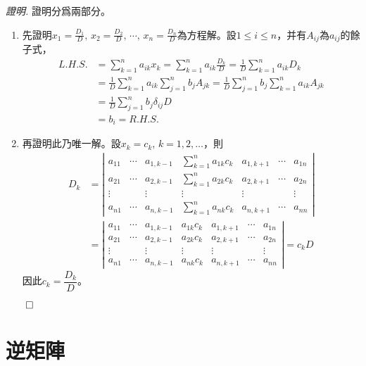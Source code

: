 \documentclass[12pt]{article}
\renewenvironment*{proof}{\textit{證明.}}{\hfill$\qed$}
\begin{document}
    \begin{proof}
        證明分爲兩部分。\begin{enumerate}
            \item 先證明$x_1=\frac{D_1}{D},\, x_2=\frac{D_2}{D},\, \cdots,\, x_n=\frac{D_n}{D}$為方程解。設$1\leq i\leq n$，并有$A_{ij}$為$a_{ij}$的餘子式，\begin{align*}
                L.H.S.&=\sum_{k=1}^{n}a_{ik}x_k=\sum_{k=1}^{n}a_{ik}\frac{D_k}{D}=\frac{1}{D}\sum_{k=1}^{n}a_{ik}D_k\\
                &=\frac{1}{D}\sum_{k=1}^{n}a_{ik}\sum_{j=1}^{n}b_jA_{jk}=\frac{1}{D}\sum_{j=1}^{n}b_j\sum_{k=1}^{n}a_{ik}A_{jk}\\
                &=\frac{1}{D}\sum_{j=1}^{n}b_j\delta_{ij}D\\
                &=b_i=R.H.S.
            \end{align*}
            \item 再證明此乃唯一解。設$x_k=c_k$, $k=1,2,\dots$，則\begin{align*}
                D_k&=\left|\begin{matrix}
                    a_{11}&\cdots&a_{1,k-1}&\sum_{k=1}^{n}a_{1k}c_k&a_{1,k+1}&\cdots&a_{1n}\\
                    a_{21}&\cdots&a_{2,k-1}&\sum_{k=1}^{n}a_{2k}c_k&a_{2,k+1}&\cdots&a_{2n}\\
                    \vdots&&\vdots&\vdots&\vdots&&\vdots\\
                    a_{n1}&\cdots&a_{n,k-1}&\sum_{k=1}^{n}a_{nk}c_k&a_{n,k+1}&\cdots&a_{nn}
                \end{matrix}\right|\\&=\left|\begin{matrix}
                    a_{11}&\cdots&a_{1,k-1}&a_{1k}c_k&a_{1,k+1}&\cdots&a_{1n}\\
                    a_{21}&\cdots&a_{2,k-1}&a_{2k}c_k&a_{2,k+1}&\cdots&a_{2n}\\
                    \vdots&&\vdots&\vdots&\vdots&&\vdots\\
                    a_{n1}&\cdots&a_{n,k-1}&a_{nk}c_k&a_{n,k+1}&\cdots&a_{nn}
                \end{matrix}\right|=c_kD
            \end{align*}
            因此$c_k=\dfrac{D_k}{D}$。
        \end{enumerate}
    \end{proof}

    \newpage
    \section*{逆矩陣}
\end{document}
